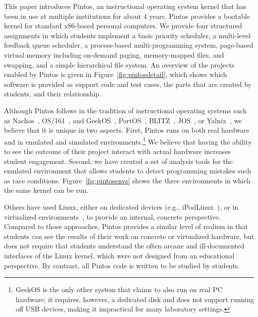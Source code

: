 This paper introduces Pintos, an instructional operating system kernel that 
has been in use at multiple institutions for about 4 years.  Pintos provides 
a bootable kernel for standard x86-based personal computers.  We provide four
structured assignments in which students implement a basic priority
scheduler, a multi-level feedback queue scheduler, a process-based 
multi-programming system, page-based virtual memory
including on-demand paging, memory-mapped files, and swapping, and a
simple hierarchical file system.  An overview of the projects enabled
by Pintos is given in Figure~\ref{fig:pintosdetail}, which shows which
software is provided as support code and test cases,
the parts that are created by students, and their relationship. 

Although Pintos follows in the tradition of instructional operating systems 
such as Nachos~\cite{Christopher1993Nachos}, OS/161~\cite{Holland2002New}, and
GeekOS~\cite{Hovemeyer2004Running}, 
PortOS~\cite{Atkin2002PortOS},
BLITZ~\cite{PorterOverview},
JOS~\cite{1088822}, or Yalnix~\cite{1088822},
we believe that it is unique in two
aspects.  First, Pintos runs on both real hardware and in emulated and
simulated environments.\footnote{\small GeekOS is the only other system that claims to 
also run on real PC hardware; it requires, however, a dedicated disk and 
does not support running off USB devices, making it impractical for many 
laboratory settings.}  We believe that having the ability to see the outcome
of their project interact with actual hardware increases student engagement.
Second, we have created a set of analysis tools
for the emulated environment that allows students to detect programming
mistakes such as race conditions.  Figure~\ref{fig:pintosenvs} shows
the three environments in which the same kernel can be run.

Others have used Linux, either on dedicated devices (e.g., iPodLinux~\cite{1352199}),
or in virtualized environments~\cite{1008027,1352648,Nieh2005Experiences}, to provide
an internal, concrete perspective.  Compared to those approaches, Pintos provides
a similar level of realism in that students can see the results of their
work on concrete or virtualized hardware, but does not require that students 
understand the often arcane and ill-documented interfaces of the Linux kernel,
which were not designed from an educational perspective.  
By contrast, all Pintos code is written to be studied by students.


\pintosenvfigure{}

\pintosdetailfiguretwo{}



